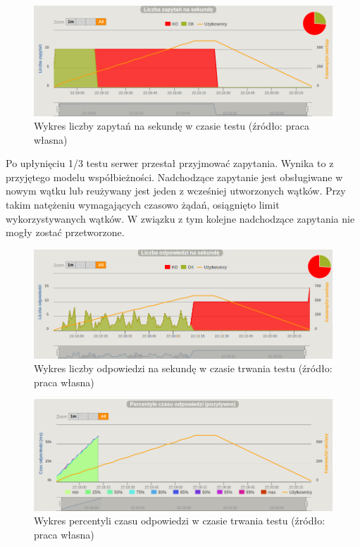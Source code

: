 \documentclass[12pt,twoside]{article}
\begin{document}
\begin{figure}[htbp]
\centering
\includegraphics[resolution=150]{test_results/java/fibonacci/screenshots/requests.png}
\caption{Wykres liczby zapytań na sekundę w czasie testu (źródło: praca własna)}
\end{figure}

Po upłynięciu 1/3 testu serwer przestał przyjmować zapytania. Wynika to
z przyjętego modelu współbieżności. Nadchodzące zapytanie jest
obsługiwane w nowym wątku lub reużywany jest jeden z wcześniej
utworzonych wątków. Przy takim natężeniu wymagających czasowo żądań,
osiągnięto limit wykorzystywanych wątków. W związku z tym kolejne
nadchodzące zapytania nie mogły zostać przetworzone.

\begin{figure}[htbp]
\centering
\includegraphics[resolution=150]{test_results/java/fibonacci/screenshots/responses.png}
\caption{Wykres liczby odpowiedzi na sekundę w czasie trwania testu (źródło: praca własna)}
\end{figure}

\begin{figure}[htbp]
\centering
\includegraphics[resolution=150]{test_results/java/fibonacci/screenshots/response_percentile.png}
\caption{Wykres percentyli czasu odpowiedzi w czasie trwania testu (źródło: praca własna)}
\end{figure}
\end{document}
